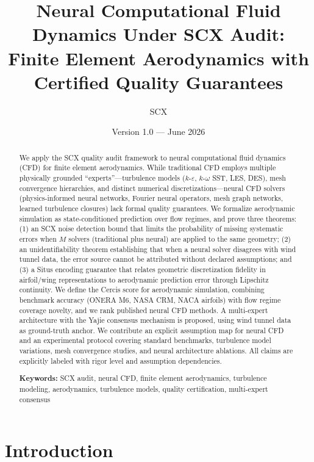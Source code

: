 \documentclass[11pt,a4paper]{article}
\title{\textbf{Neural Computational Fluid Dynamics Under SCX Audit:}\\
\large Finite Element Aerodynamics with Certified Quality Guarantees}
\author{SCX}
\date{Version 1.0 --- June 2026}
\theoremstyle{definition}
\theoremstyle{remark}
\begin{document}
\maketitle

\begin{abstract}
We apply the SCX quality audit framework to neural computational fluid dynamics (CFD) for finite element aerodynamics.
While traditional CFD employs multiple physically grounded ``experts''---turbulence models ($k$-$\varepsilon$, $k$-$\omega$ SST, LES, DES), mesh convergence hierarchies, and distinct numerical discretizations---neural CFD solvers (physics-informed neural networks, Fourier neural operators, mesh graph networks, learned turbulence closures) lack formal quality guarantees.
We formalize aerodynamic simulation as state-conditioned prediction over flow regimes, and prove three theorems:
(1) an SCX noise detection bound that limits the probability of missing systematic errors when $M$ solvers (traditional plus neural) are applied to the same geometry;
(2) an unidentifiability theorem establishing that when a neural solver disagrees with wind tunnel data, the error source cannot be attributed without declared assumptions; and
(3) a Situs encoding guarantee that relates geometric discretization fidelity in airfoil/wing representations to aerodynamic prediction error through Lipschitz continuity.
We define the Cercis score for aerodynamic simulation, combining benchmark accuracy (ONERA M6, NASA CRM, NACA airfoils) with flow regime coverage novelty, and we rank published neural CFD methods.
A multi-expert architecture with the Yajie consensus mechanism is proposed, using wind tunnel data as ground-truth anchor.
We contribute an explicit assumption map for neural CFD and an experimental protocol covering standard benchmarks, turbulence model variations, mesh convergence studies, and neural architecture ablations.
All claims are explicitly labeled with rigor level and assumption dependencies.

\noindent\textbf{Keywords:} SCX audit, neural CFD, finite element aerodynamics, turbulence modeling, aerodynamics, turbulence models, quality certification, multi-expert consensus
\end{abstract}

\section{Introduction}
\end{document}

